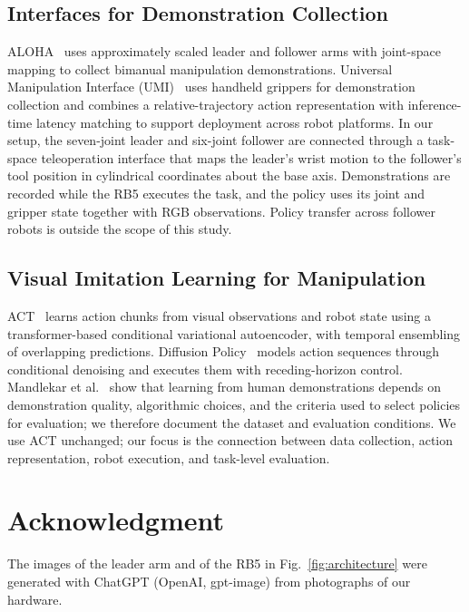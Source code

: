 \documentclass[conference]{IEEEtran}
\begin{document}
\subsection{Interfaces for Demonstration Collection}
ALOHA~\cite{zhao2023act} uses approximately scaled leader and follower arms
with joint-space mapping to collect bimanual manipulation demonstrations.
Universal Manipulation Interface (UMI)~\cite{chi2024umi} uses handheld grippers
for demonstration collection and combines a relative-trajectory action
representation with inference-time latency matching to support deployment
across robot platforms. In our setup, the seven-joint leader and six-joint follower are connected
through a task-space teleoperation interface that maps the leader's wrist
motion to the follower's tool position in cylindrical coordinates about the
base axis. Demonstrations are recorded
while the RB5 executes the task, and the policy uses its joint and gripper
state together with RGB observations. Policy transfer across follower robots
is outside the scope of this study.

\subsection{Visual Imitation Learning for Manipulation}
ACT~\cite{zhao2023act} learns action chunks from visual observations and robot
state using a transformer-based conditional variational autoencoder, with
temporal ensembling of overlapping predictions. Diffusion
Policy~\cite{chi2023diffusion} models action sequences through conditional
denoising and executes them with receding-horizon control. Mandlekar et
al.~\cite{mandlekar2022offline} show that learning from human demonstrations
depends on demonstration quality, algorithmic choices, and the criteria used
to select policies for evaluation; we therefore document the dataset and
evaluation conditions. We use ACT unchanged; our focus is the connection
between data collection, action representation, robot execution, and
task-level evaluation.











\section*{Acknowledgment}
The images of the leader arm and of the RB5 in Fig.~\ref{fig:architecture} were
generated with ChatGPT (OpenAI, gpt-image) from photographs of our hardware.



\end{document}
